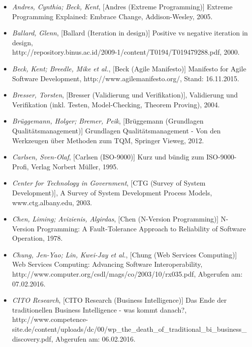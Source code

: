 \begin{itemize}

    \item[] \emph{Andres, Cynthia; Beck, Kent}, [Andres (Extreme Programming)] Extreme Programming Explained: Embrace Change, Addison-Wesley, 2005.

    \item[] \emph{Ballard, Glenn}, [Ballard (Iteration in design)] Positive vs negative iteration in design, \\http://repository.binus.ac.id/2009-1/content/T0194/T019479288.pdf, 2000.

    \item[] \emph{Beck, Kent; Breedle, Mike et al.}, [Beck (Agile Manifesto)] Manifesto for Agile Software Development, http://www.agilemanifesto.org/, Stand: 16.11.2015.

    \item[] \emph{Bresser, Torsten}, [Bresser (Validierung und Verifikation)], Validierung und Verifikation (inkl. Testen, Model-Checking, Theorem Proving), 2004.

    \item[] \emph{Brüggemann, Holger; Bremer, Peik}, [Brüggemann (Grundlagen Qualitätsmanagement)] Grundlagen Qualitätsmanagement - Von den Werkzeugen über Methoden zum TQM, Springer Vieweg, 2012.

    \item[] \emph{Carlsen, Sven-Olaf}, [Carlsen (ISO-9000)] Kurz und bündig zum ISO-9000-Profi, Verlag Norbert Müller, 1995.

    \item[] \emph{Center for Technology in Government}, [CTG (Survey of System Development)], A Survey of System Development Process Models, www.ctg.albany.edu, 2003.

    \item[] \emph{Chen, Liming; Avizienis, Algirdas}, [Chen (N-Version Programming)] N-Version Programming: A Fault-Tolerance Approach to Reliability of Software Operation, 1978.

    \item[] \emph{Chung, Jen-Yao; Lin, Kwei-Jay et al.}, [Chung (Web Services Computing)] Web Services Computing: Advancing Software Interoperability, http://www.computer.org/csdl/mags/co/2003/10/rx035.pdf, Abgerufen am: 07.02.2016.

    \item[] \emph{CITO Research}, [CITO Research (Business Intelligence)] Das Ende der traditionellen Business Intelligence - was kommt danach?, http://www.competence-site.de/content/uploads/dc/00/wp\_the\_death\_of\_traditional\_bi\_business\_discovery.pdf, Abgerufen am: 06.02.2016.


\end{itemize}
